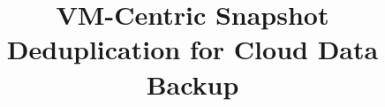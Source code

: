 \documentclass[10pt,reprint]{socc14}
\newcommand{\comments}[1]{}
\begin{document}
\setlength{\pdfpageheight}{\paperheight}
\setlength{\pdfpagewidth}{\paperwidth}

\title{VM-Centric Snapshot Deduplication for Cloud Data Backup}
\comments{
\authorinfo{Wei Zhang\and Daniel Agun\and Tao Yang}
           {UC Santa Barbara}
           {\{wei,dagun,tyang\}@cs.ucsb.edu}
\authorinfo{Hong Tang}
           {Alibaba Inc.}
           {hongtang@alibaba-inc.com}
\authorinfo{Rich Wolski}
           {UC Santa Barbara}
           {rich@cs.ucsb.edu}
}



\comments{
\author{
\IEEEauthorblockN{Wei Zhang\IEEEauthorrefmark{1,2}, Daniel Agun\IEEEauthorrefmark{2}, 
Tao Yang\IEEEauthorrefmark{1}, Rich Wolski\IEEEauthorrefmark{1}, 
Hong Tan\IEEEauthorrefmark{3}}
\IEEEauthorblockA{\IEEEauthorrefmark{1}University of California at Santa Barbara}
\IEEEauthorblockA{\IEEEauthorrefmark{2}Pure Storage Inc.}
\IEEEauthorblockA{\IEEEauthorrefmark{3}Alibaba Inc.}
}
}
\maketitle










%






\end{document}
